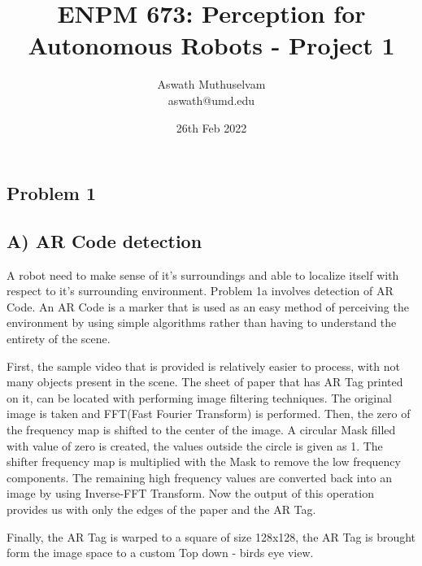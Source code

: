\documentclass[a4paper, 10pt]{article}
\title{ENPM 673: Perception for Autonomous Robots - Project 1}
\author{Aswath Muthuselvam \\ aswath@umd.edu}
\date{26th Feb 2022}
\begin{document}
	\maketitle
	
	\begin{multicols}{2}
		
		\section{Problem 1}
		\subsection{A) AR Code detection}
		
		A robot need to make sense of it's surroundings and able to localize itself with respect to it's surrounding environment. Problem 1a involves detection of AR Code. An AR Code is a marker that is used as an easy method of perceiving the environment by using simple algorithms rather than having to understand the entirety of the scene. 
		
		First, the sample video that is provided is relatively easier to process, with not many objects present in the scene. The sheet of paper that has AR Tag printed on it, can be located with performing image filtering techniques. The original image is taken and FFT(Fast Fourier Transform) is performed. Then, the zero of the frequency map is shifted to the center of the image. A circular Mask filled with value of zero is created, the values outside the circle is given as 1. The shifter frequency map is multiplied with the Mask to remove the low frequency components. The remaining high frequency values are converted back into an image by using Inverse-FFT Transform. Now the output of this operation provides us with only the edges of the paper and the AR Tag. 
		

		Finally, the AR Tag is warped to a square of size 128x128, the AR Tag is brought form the image space to a custom Top down - birds eye view.
		

\end{multicols}
\end{document}
